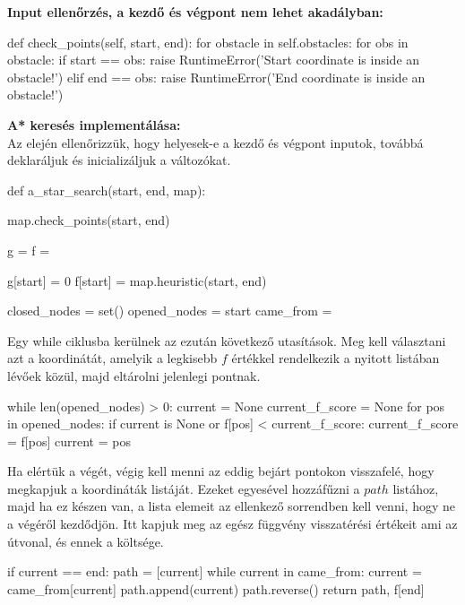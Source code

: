 \bigskip
\bigskip

\textbf{Input ellenőrzés, a kezdő és végpont nem lehet akadályban:}
\\
\begin{python}
	def check_points(self, start, end):
        for obstacle in self.obstacles:
            for obs in obstacle:
                if start == obs:
                    raise RuntimeError('Start coordinate is inside 
                    an obstacle!')
                elif end == obs:
                    raise RuntimeError('End coordinate is inside
                    an obstacle!')
\end{python}

\bigskip
\bigskip

\textbf{A* keresés implementálása:}
\\

Az elején ellenőrizzük, hogy helyesek-e a kezdő és végpont inputok, továbbá deklaráljuk és inicializáljuk a változókat.
\begin{python}
def a_star_search(start, end, map):

    map.check_points(start, end)

    g = {}  
    f = {}  

    g[start] = 0
    f[start] = map.heuristic(start, end)

    closed_nodes = set()
    opened_nodes = {start}
    came_from = {}
\end{python}

\bigskip
\bigskip

Egy while ciklusba kerülnek az ezután következő utasítások. Meg kell választani azt a koordinátát, amelyik a legkisebb $ f $ értékkel rendelkezik a nyitott listában lévőek közül, majd eltárolni jelenlegi pontnak. 
\begin{python}
	while len(opened_nodes) > 0:
        current = None
        current_f_score = None
        for pos in opened_nodes:
            if current is None or f[pos] < current_f_score:
                current_f_score = f[pos]
                current = pos

\end{python}

\bigskip
\bigskip

Ha elértük a végét, végig kell menni az eddig bejárt pontokon visszafelé, hogy megkapjuk a koordináták listáját. Ezeket egyesével hozzáfűzni a $ path $ listához, majd ha ez készen van, a lista elemeit az ellenkező sorrendben kell venni, hogy ne a végéről kezdődjön. Itt kapjuk meg az egész függvény visszatérési értékeit ami az útvonal, és ennek a költsége.
\begin{python}
	if current == end:
            path = [current]
            while current in came_from:
                current = came_from[current]
                path.append(current)
            path.reverse()
            return path, f[end]
\end{python}


